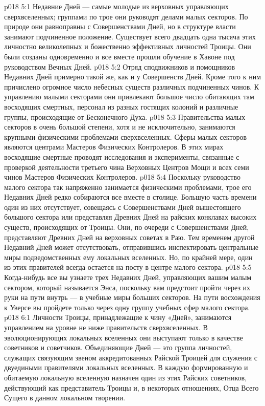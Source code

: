\vs p018 5:1 Недавние Дней --- самые молодые из верховных управляющих сверхвселенных; группами по трое они руководят делами малых секторов. По природе они равноправны с Совершенствами Дней, но в структуре власти занимают подчиненное положение. Существует всего двадцать одна тысяча этих личностно великолепных и божественно эффективных личностей Троицы. Они были созданы одновременно и все вместе прошли обучение в Хавоне под руководством Вечных Дней.
\vs p018 5:2 Отряд сподвижников и помощников Недавних Дней примерно такой же, как и у Совершенств Дней. Кроме того к ним причислено огромное число небесных существ различных подчиненных чинов. К управлению малыми секторами они привлекают большое число обитающих там восходящих смертных, персонал из разных гостящих колоний и различные группы, происходящие от Бесконечного Духа.
\vs p018 5:3 Правительства малых секторов в очень большой степени, хотя и не исключительно, занимаются крупными физическими проблемами сверхвселенных. Сферы малых секторов являются центрами Мастеров Физических Контролеров. В этих мирах восходящие смертные проводят исследования и эксперименты, связанные с проверкой деятельности третьего чина Верховных Центров Мощи и всех семи чинов Мастеров Физических Контролеров.
\vs p018 5:4 Поскольку руководство малого сектора так напряженно занимается физическими проблемами, трое его Недавних Дней редко собираются все вместе в столице. Большую часть времени один из них отсутствует, совещаясь с Совершенствами Дней вышестоящего большого сектора или представляя Древних Дней на райских конклавах высоких существ, происходящих от Троицы. Они, по очереди с Совершенствами Дней, представляют Древних Дней на верховных советах в Раю. Тем временем другой Недавний Дней может отсутствовать, отправившись инспектировать центральные миры подведомственных ему локальных вселенных. Но, по крайней мере, один из этих правителей всегда остается на посту в центре малого сектора.
\vs p018 5:5 Когда\hyp{}нибудь все вы узнаете трех Недавних Дней, управляющих вашим малым сектором, который называется Энса, поскольку вам предстоит пройти через их руки на пути внутрь --- в учебные миры больших секторов. На пути восхождения к Уверсе вы пройдете только через одну группу учебных сфер малого сектора.
\vs p018 6:1 Личности Троицы, принадлежащие к чину «Дней», занимаются управлением на уровне не ниже правительств сверхвселенных. В эволюционирующих локальных вселенных они выступают только в качестве советников и советчиков. Объединяющие Дней --- это группа личностей, служащих связующим звеном аккредитованных Райской Троицей для служения с двуедиными правителями локальных вселенных. В каждую формированную и обитаемую локальную вселенную назначен один из этих Райских советников, действующий как представитель Троицы и, в некоторых отношениях, Отца Всего Сущего в данном локальном творении.
